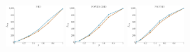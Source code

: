 \documentclass[a4paper]{report}
\newcommand{\wratio}{0.16}
\begin{document}
\vfill
\includegraphics[width=\wratio\textwidth]{influence/PHD/fs_phd}\hfill
\includegraphics[width=\wratio\textwidth]{influence/POWER_GRID/fs_power_grid}\hfill
\includegraphics[width=\wratio\textwidth]{influence/PROTEIN/fs_protein}\hfill
\end{document}
